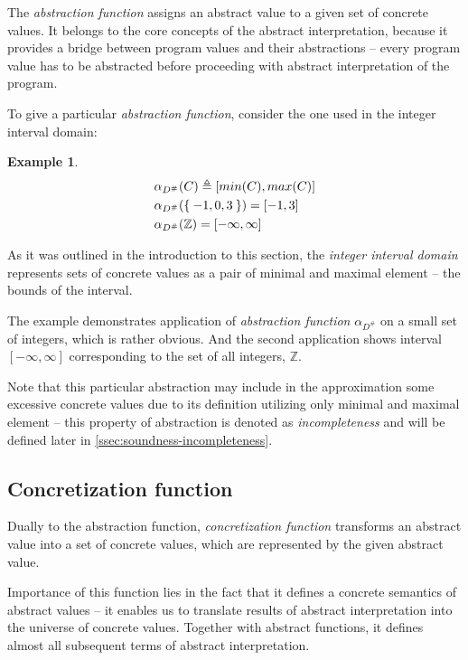 \documentclass[12pt,oneside]{fithesis2}
\theoremstyle{definition}
\newtheorem{exmp}{Example}[section]
\begin{document}
The \textit{abstraction function} assigns an abstract value to a given set of concrete values. It belongs to the core concepts of the abstract interpretation, because it provides a bridge between program values and their abstractions -- every program value has to be abstracted before proceeding with abstract interpretation of the program.

To give a particular \textit{abstraction function}, consider the one used in the integer interval domain:

\begin{exmp}
  \begin{align*}
    &\alpha_{D^\#}(C) \triangleq [min(C), max(C)]\\
    &\alpha_{D^\#}(\Set{-1, 0, 3}) = [-1, 3]\\
    &\alpha_{D^\#}(\mathbb Z) = [-\infty, \infty]
  \end{align*}
\end{exmp}

As it was outlined in the introduction to this section, the \textit{integer interval domain} represents sets of concrete values as a pair of minimal and maximal element -- the bounds of the interval.

The example demonstrates application of \textit{abstraction function} $\alpha_{D^\#}$ on a small set of integers, which is rather obvious. And the second application shows interval $[-\infty, \infty]$ corresponding to the set of all integers, $\mathbb Z$.

Note that this particular abstraction may include in the approximation some excessive concrete values due to its definition utilizing only minimal and maximal element -- this property of abstraction is denoted as \textit{incompleteness} and will be defined later in \ref{ssec:soundness-incompleteness}.

\subsection{Concretization function}
Dually to the abstraction function, \textit{concretization function} transforms an abstract value into a set of concrete values, which are represented by the given abstract value.

Importance of this function lies in the fact that it defines a concrete semantics of abstract values -- it enables us to translate results of abstract interpretation into the universe of concrete values. Together with abstract functions, it defines almost all subsequent terms of abstract interpretation.
\end{document}
